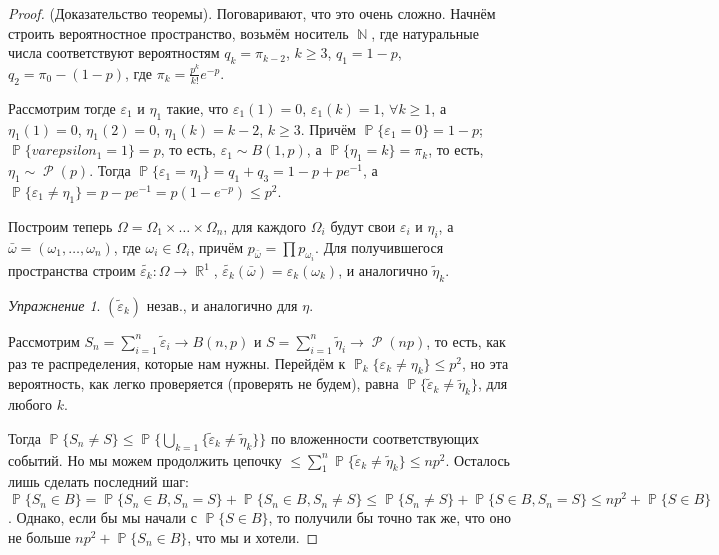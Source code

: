 \documentclass[a4paper,100pt]{article}
\theoremstyle{indented}
\theoremstyle{definition}
\theoremstyle{remark}
\newtheorem{exer}{Упражнение}
\DeclareMathOperator{\RR}{\mathbb{R}}
\DeclareMathOperator{\NN}{\mathbb{N}}
\DeclareMathOperator{\PP}{\mathbb{P}}
\DeclareMathOperator{\Rho}{\mathcal{P}}
\begin{document}
\begin{proof}
    (Доказательство теоремы). Поговаривают, что это очень сложно. Начнём строить вероятностное пространство, возьмём носитель $\NN$, где натуральные числа соответствуют вероятностям $q_k=\pi_{k-2}$, $k\geq 3$, $q_1=1-p$, $q_2=\pi_0-(1-p)$, где $\pi_k=\frac{p^k}{k!}e^{-p}$. \ 

    Рассмотрим тогде $\varepsilon_1$ и $\eta_1$ такие, что $\varepsilon_1(1)=0$, $\varepsilon_1(k)=1$, $\forall k\geq 1$, а $\eta_1(1)=0$, $\eta_1(2)=0$, $\eta_1(k)=k-2$, $k\geq 3$. Причём $\PP\{\varepsilon_1=0\}=1-p$; $\PP\{varepsilon_1=1\}=p$, то есть, $\varepsilon_1 \sim B(1, p)$, а $\PP\{\eta_1=k\}=\pi_k$, то есть, $\eta_1\sim \Rho(p)$. Тогда $\PP\{\varepsilon_1=\eta_1\}=q_1+q_3=1-p+pe^{-1}$, а $\PP\{\varepsilon_1 \neq \eta_1\} = p-pe^{-1}=p(1-e^{-p})\leq p^2$. \ 

    Построим теперь $\Omega = \Omega_1 \times \ldots \times \Omega_n$, для каждого $\Omega_i$ будут свои $\varepsilon_i$ и $\eta_i$, а $\bar{\omega}=(\omega_1, \ldots, \omega_n)$, где $\omega_i\in \Omega_i$, причём $p_{\bar{\omega}}=\prod p_{\omega_i}$. Для получившегося пространства строим $\tilde{\varepsilon_k}: \Omega \rightarrow \RR^1$, $\tilde{\varepsilon_k}(\bar{\omega})=\varepsilon_k(\omega_k)$, и аналогично $\tilde{\eta}_k$. 

    \begin{exer}
        $(\tilde{\varepsilon}_k)$ незав., и аналогично для $\eta$. 
    \end{exer}

    Рассмотрим $S_n=\sum_{i=1}^n \tilde{\varepsilon}_i \longrightarrow B(n, p)$ и $S=\sum_{i=1}^n \tilde{\eta}_i \longrightarrow \Rho(np)$, то есть, как раз те распределения, которые нам нужны. Перейдём к $\PP_k\{\varepsilon_k\neq \eta_k\}\leq p^2$, но эта вероятность, как легко проверяется (проверять не будем), равна $\PP\{\tilde{\varepsilon}_k \neq \tilde{\eta}_k\}$, для любого $k$. \ 

    Тогда $\PP\{S_n \neq S\} \leq \PP\{\bigcup_{k=1}\{\tilde{\varepsilon}_k \neq \tilde{\eta}_k\}\}$ по вложенности соответствующих событий. Но мы можем продолжить цепочку $\leq \sum_1^n \PP\{\tilde{\varepsilon}_k \neq \tilde{\eta}_k\}\leq np^2$. Осталось лишь сделать последний шаг: $\PP\{S_n \in B\}=\PP\{S_n\in B, S_n=S\}+\PP\{S_n \in B, S_n \neq S\}\leq \PP\{S_n \neq S\}+\PP\{S\in B, S_n=S\}\leq np^2+\PP\{S\in B\}$. Однако, если бы мы начали с $\PP\{S\in B\}$, то получили бы точно так же, что оно не больше $np^2+\PP\{S_n\in B\}$, что мы и хотели.
\end{proof}
\end{document}

